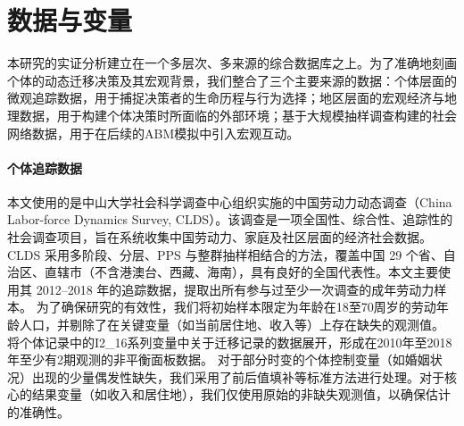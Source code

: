 \documentclass[master, final]{zufe-thesis}
\begin{document}
\section{数据与变量}

本研究的实证分析建立在一个多层次、多来源的综合数据库之上。为了准确地刻画个体的动态迁移决策及其宏观背景，我们整合了三个主要来源的数据：个体层面的微观追踪数据，用于捕捉决策者的生命历程与行为选择；地区层面的宏观经济与地理数据，用于构建个体决策时所面临的外部环境；基于大规模抽样调查构建的社会网络数据，用于在后续的ABM模拟中引入宏观互动。

\paragraph{个体追踪数据}

本文使用的是中山大学社会科学调查中心组织实施的中国劳动力动态调查（China Labor-force Dynamics Survey, CLDS）。该调查是一项全国性、综合性、追踪性的社会调查项目，旨在系统收集中国劳动力、家庭及社区层面的经济社会数据。CLDS 采用多阶段、分层、PPS 与整群抽样相结合的方法，覆盖中国 29 个省、自治区、直辖市（不含港澳台、西藏、海南），具有良好的全国代表性。本文主要使用其 2012–2018 年的追踪数据，提取出所有参与过至少一次调查的成年劳动力样本。
为了确保研究的有效性，我们将初始样本限定为年龄在18至70周岁的劳动年龄人口，并剔除了在关键变量（如当前居住地、收入等）上存在缺失的观测值。
将个体记录中的I2\_16系列变量中关于迁移记录的数据展开，形成在2010年至2018年至少有2期观测的非平衡面板数据。
对于部分时变的个体控制变量（如婚姻状况）出现的少量偶发性缺失，我们采用了前后值填补等标准方法进行处理。对于核心的结果变量（如收入和居住地），我们仅使用原始的非缺失观测值，以确保估计的准确性。
\end{document}
